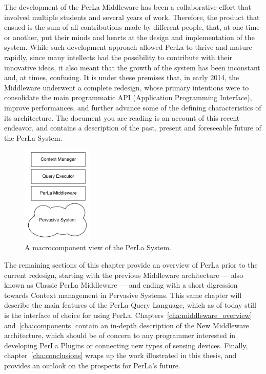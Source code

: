 The development of the PerLa Middleware has been a collaborative effort that
involved multiple students and several years of work. Therefore, the product
that ensued is the sum of all contributions made by different people, that, at
one time or another, put their minds and hearts at the design and
implementation of the system. While such development approach allowed PerLa to
thrive and mature rapidly, since many intellects had the possibility to
contribute with their innovative ideas, it also meant that the growth of the
system has been inconstant and, at times, confusing. It is under these premises
that, in early 2014, the Middleware underwent a complete redesign, whose
primary intentions were to consolidate the main programmatic API (Application
Programming Interface), improve performances, and further advance some of the
defining characteristics of its architecture. The document you are reading is
an account of this recent endeavor, and contains a description of the past,
present and foreseeable future of the PerLa System.

\begin{figure}[h!]
\center
\includegraphics[width=0.3\textwidth]{imgs/main_layers.pdf}
\caption{A macrocomponent view of the PerLa System.}
\end{figure}

The remaining sections of this chapter provide an overview of PerLa prior to
the current redesign, starting with the previous Middleware architecture ---
also known as Classic PerLa Middleware --- and ending with a short digression
towards Context management in Pervasive Systems. This same chapter will
describe the main features of the PerLa Query Language, which as of today still
is the interface of choice for using PerLa.
Chapters~\ref{cha:middleware_overview} and~\ref{cha:components} contain an
in-depth description of the New Middleware architecture, which should be of
concern to any programmer interested in developing PerLa Plugins or connecting
new types of sensing devices. Finally, chapter~\ref{cha:conclusions} wraps up
the work illustrated in this thesis, and provides an outlook on the prospects
for PerLa's future.


